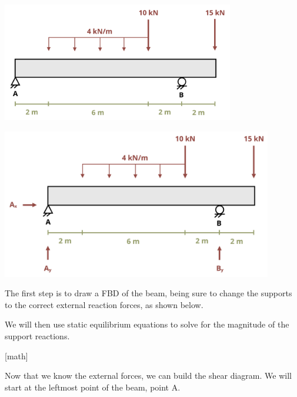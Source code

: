 \documentclass[
  letterpaper,
  DIV=11,
  numbers=noendperiod]{scrreprt}
\begin{document}
\begin{tcolorbox}[enhanced jigsaw, colback=white, colframe=quarto-callout-note-color-frame, leftrule=.75mm, opacitybacktitle=0.6, colbacktitle=quarto-callout-note-color!10!white, arc=.35mm, bottomrule=.15mm, breakable, title={Example 7.3: Draw the shear and moment for the beam shown.}, left=2mm, titlerule=0mm, toptitle=1mm, toprule=.15mm, opacityback=0, rightrule=.15mm, coltitle=black, bottomtitle=1mm]

\begin{center}
\includegraphics[width=3.98958in,height=\textheight]{images/CH7 PNGs/example 7.3 part 1.png}
\end{center}

\begin{center}
\includegraphics[width=4.65625in,height=\textheight]{images/CH7 PNGs/example 7.3 part 2.png}
\end{center}

The first step is to draw a FBD of the beam, being sure to change the
supports to the correct external reaction forces, as shown below.

We will then use static equilibrium equations to solve for the magnitude
of the support reactions.

{[}math{]}

Now that we know the external forces, we can build the shear diagram. We
will start at the leftmost point of the beam, point A.


\end{tcolorbox}
\end{document}
